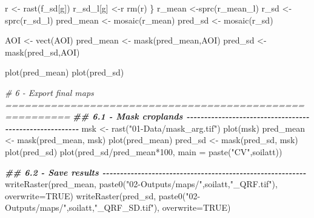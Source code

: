 \documentclass[
  10pt,
  b5paper,
  oneside]{book}
\newenvironment{Shaded}{\begin{snugshade}}{\end{snugshade}}
\newcommand{\AttributeTok}[1]{\textcolor[rgb]{0.77,0.63,0.00}{#1}}
\newcommand{\CommentTok}[1]{\textcolor[rgb]{0.56,0.35,0.01}{\textit{#1}}}
\newcommand{\ConstantTok}[1]{\textcolor[rgb]{0.00,0.00,0.00}{#1}}
\newcommand{\DecValTok}[1]{\textcolor[rgb]{0.00,0.00,0.81}{#1}}
\newcommand{\DocumentationTok}[1]{\textcolor[rgb]{0.56,0.35,0.01}{\textbf{\textit{#1}}}}
\newcommand{\FunctionTok}[1]{\textcolor[rgb]{0.00,0.00,0.00}{#1}}
\newcommand{\NormalTok}[1]{#1}
\newcommand{\OtherTok}[1]{\textcolor[rgb]{0.56,0.35,0.01}{#1}}
\newcommand{\SpecialCharTok}[1]{\textcolor[rgb]{0.00,0.00,0.00}{#1}}
\newcommand{\StringTok}[1]{\textcolor[rgb]{0.31,0.60,0.02}{#1}}
\begin{document}
\begin{Shaded}
\begin{Highlighting}[]
\NormalTok{  r }\OtherTok{\textless{}{-}} \FunctionTok{rast}\NormalTok{(f\_sd[g])}
\NormalTok{  r\_sd\_l[g] }\OtherTok{\textless{}{-}}\NormalTok{r}
  \FunctionTok{rm}\NormalTok{(r)}
\NormalTok{\}}
\NormalTok{r\_mean }\OtherTok{\textless{}{-}}\FunctionTok{sprc}\NormalTok{(r\_mean\_l)}
\NormalTok{r\_sd }\OtherTok{\textless{}{-}}\FunctionTok{sprc}\NormalTok{(r\_sd\_l)}
\NormalTok{pred\_mean }\OtherTok{\textless{}{-}} \FunctionTok{mosaic}\NormalTok{(r\_mean)}
\NormalTok{pred\_sd }\OtherTok{\textless{}{-}} \FunctionTok{mosaic}\NormalTok{(r\_sd)}

\NormalTok{AOI }\OtherTok{\textless{}{-}} \FunctionTok{vect}\NormalTok{(AOI)}
\NormalTok{pred\_mean }\OtherTok{\textless{}{-}} \FunctionTok{mask}\NormalTok{(pred\_mean,AOI)}
\NormalTok{pred\_sd }\OtherTok{\textless{}{-}} \FunctionTok{mask}\NormalTok{(pred\_sd,AOI)}


\FunctionTok{plot}\NormalTok{(pred\_mean)}
\FunctionTok{plot}\NormalTok{(pred\_sd)}


\CommentTok{\# 6 {-} Export final maps ========================================================}
\DocumentationTok{\#\# 6.1 {-} Mask croplands {-}{-}{-}{-}{-}{-}{-}{-}{-}{-}{-}{-}{-}{-}{-}{-}{-}{-}{-}{-}{-}{-}{-}{-}{-}{-}{-}{-}{-}{-}{-}{-}{-}{-}{-}{-}{-}{-}{-}{-}{-}{-}{-}{-}{-}{-}{-}{-}{-}{-}{-}{-}{-}{-}{-}{-}}
\NormalTok{msk }\OtherTok{\textless{}{-}} \FunctionTok{rast}\NormalTok{(}\StringTok{"01{-}Data/mask\_arg.tif"}\NormalTok{)}
\FunctionTok{plot}\NormalTok{(msk)}
\NormalTok{pred\_mean }\OtherTok{\textless{}{-}} \FunctionTok{mask}\NormalTok{(pred\_mean, msk)}
\FunctionTok{plot}\NormalTok{(pred\_mean)}
\NormalTok{pred\_sd }\OtherTok{\textless{}{-}} \FunctionTok{mask}\NormalTok{(pred\_sd, msk)}
\FunctionTok{plot}\NormalTok{(pred\_sd)}
\FunctionTok{plot}\NormalTok{(pred\_sd}\SpecialCharTok{/}\NormalTok{pred\_mean}\SpecialCharTok{*}\DecValTok{100}\NormalTok{, }\AttributeTok{main =} \FunctionTok{paste}\NormalTok{(}\StringTok{"CV"}\NormalTok{,soilatt))}

\DocumentationTok{\#\# 6.2 {-} Save results {-}{-}{-}{-}{-}{-}{-}{-}{-}{-}{-}{-}{-}{-}{-}{-}{-}{-}{-}{-}{-}{-}{-}{-}{-}{-}{-}{-}{-}{-}{-}{-}{-}{-}{-}{-}{-}{-}{-}{-}{-}{-}{-}{-}{-}{-}{-}{-}{-}{-}{-}{-}{-}{-}{-}{-}{-}{-}}
\FunctionTok{writeRaster}\NormalTok{(pred\_mean, }
            \FunctionTok{paste0}\NormalTok{(}\StringTok{"02{-}Outputs/maps/"}\NormalTok{,soilatt,}\StringTok{"\_QRF.tif"}\NormalTok{),}
            \AttributeTok{overwrite=}\ConstantTok{TRUE}\NormalTok{)}
\FunctionTok{writeRaster}\NormalTok{(pred\_sd, }
            \FunctionTok{paste0}\NormalTok{(}\StringTok{"02{-}Outputs/maps/"}\NormalTok{,soilatt,}\StringTok{"\_QRF\_SD.tif"}\NormalTok{),}
            \AttributeTok{overwrite=}\ConstantTok{TRUE}\NormalTok{)}
\end{Highlighting}
\end{Shaded}
\end{document}
